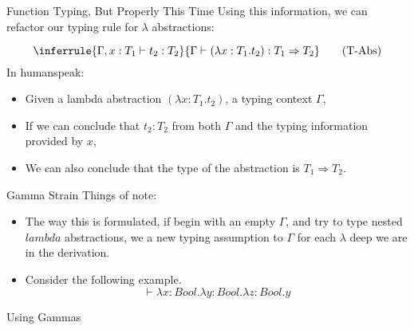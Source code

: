 \documentclass[11pt]{beamer}
\begin{document}
\begin{frame}[fragile=singleslide]{Function Typing, But Properly This Time}
Using this information, we can refactor our typing rule for $\lambda$ abstractions:

\begin{equation}
\inferrule{\Gamma, x : T_1 \vdash t_2 : T_2}{\Gamma \vdash (\lambda x : T_1. t_2) : T_1 \Rightarrow T_2} \tag{T-Abs}
\end{equation}
In humanspeak:
\begin{itemize}
\item Given a lambda abstraction $(\lambda x : T_1. t_2)$, a typing context $\Gamma$,
\item If we can conclude that $t_2 : T_2$ from both $\Gamma$ and the typing information provided by $x$,
\item We can also conclude that the type of the abstraction is $T_1 \Rightarrow T_2$.
\end{itemize}
\end{frame}


\begin{frame}[fragile=singleslide]{Gamma Strain}
Things of note:
\begin{itemize}
\item The way this is formulated, if begin with an empty $\Gamma$, and try to type nested $lambda$ abstractions, we a new typing assumption to $\Gamma$ for each $\lambda$ deep we are in the derivation.  
\item Consider the following example.   
\begin{equation}
\vdash \lambda x : Bool. \lambda y : Bool. \lambda z : Bool. y 
\end{equation}

\end{itemize}
\end{frame}

\begin{frame}[fragile=singleslide]{Using Gammas}
\small
\begin{flagderiv}
\end{flagderiv}
\end{frame}
\end{document}

